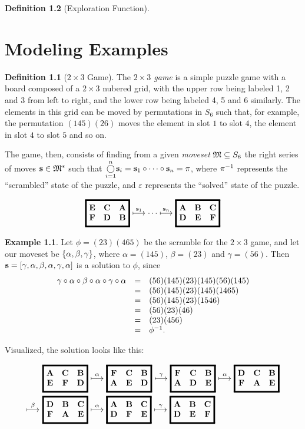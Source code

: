 \documentclass[a4paper,twoside,12pt,openany]{report}
\theoremstyle{plain}
\theoremstyle{definition}
\newtheorem{definition}{Definition}
\newtheorem{example}{Example}
\theoremstyle{remark}
\begin{document}
\begin{definition}[Exploration Function]
\chapter{Modeling Examples}

\begin{definition}[\(2\times 3\) Game]
The \emph{\(2\times 3\) game} is a simple puzzle game with a board composed of a \(2\times 3\) nubered grid, with the upper row being labeled 1, 2 and 3 from left to right, and the lower row being labeled 4, 5 and 6 similarly. The elements in this grid can be moved by permutations in \(S_6\) such that, for example, the permutation \((145)(26)\) moves the element in slot \(1\) to slot \(4\), the element in slot \(4\) to slot \(5\) and so on.

The game, then, consists of finding from a given \textit{moveset} \(\mathfrak{M}\subseteq S_6\) the right series of moves \(\mathbf{s}\in\mathfrak{M}^*\) such that \(\overset{n}{\underset{i=1}{\bigcirc}} \mathbf{s}_i=\mathbf{s}_1\circ \cdots \circ \mathbf{s}_n=\pi\), where \(\pi^{-1}\) represents the ``scrambled'' state of the puzzle, and \(\varepsilon\) represents the ``solved'' state of the puzzle.

\[
	\gameboard[E C A F D B]
	\overset{\solarr_1}\gamemovearrow
	\cdots
	\overset{\solarr_n}\gamemovearrow
	\gameboard[A B C D E F]
\]
\end{definition}

\begin{example}
	Let \(\phi=(23)(465)\) be the scramble for the \(2\times 3\) game, and let our moveset be \(\left\{ \alpha,\beta,\gamma \right\}\), where \(\alpha=(145)\), \(\beta=(23)\) and \(\gamma=(56)\). Then 
	\(
		\mathbf{s}=\left[ \gamma,\alpha,\beta,\alpha,\gamma,\alpha \right]
	\)
	is a solution to \(\phi\), since
	\[
		\begin{array}{rcl}
			\gamma\circ\alpha\circ\beta\circ\alpha\circ\gamma\circ\alpha &= &(56)(145)(23)(145)(56)(145) \\
			&= &(56)(145)(23)(145)(1465) \\
			&= &(56)(145)(23)(1546) \\
			&= &(56)(23)(46) \\
			&= &(23)(456) \\
			&= &\phi^{-1}.
		\end{array}
	\]

	Visualized, the solution looks like this:

\begin{align*}
	& \gameboard[A C B E F D]
	\overset{\alpha}\gamemovearrow
	\gameboard[F C B A E D]
	\overset{\gamma}\gamemovearrow
	\gameboard[F C B A D E]
	\overset{\alpha}\gamemovearrow
	\gameboard[D C B F A E]\\
	\overset{\beta}\gamemovearrow\ 
	&\gameboard[D B C F A E]
	\overset{\alpha}\gamemovearrow
	\gameboard[A B C D F E]
	\overset{\gamma}\gamemovearrow
	\gameboard[A B C D E F]
\end{align*}
\end{example}


\end{definition}
\end{document}
